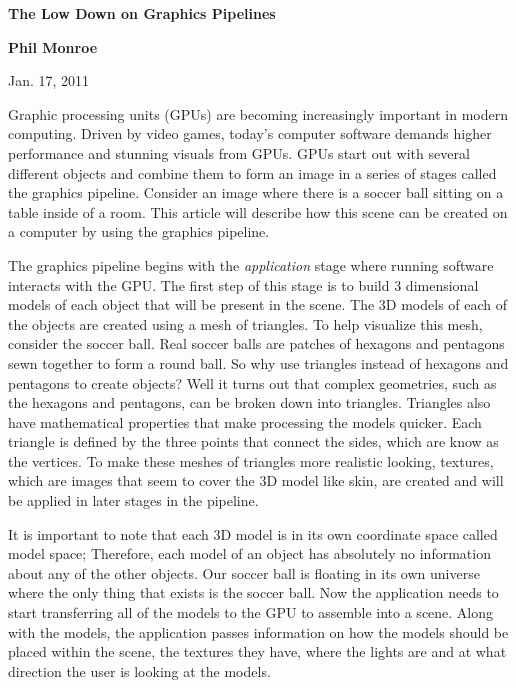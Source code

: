 \documentclass[12pt] {article}
\begin{document}

\centerline{\Large \bf The Low Down on Graphics Pipelines}

\centerline{\bf Phil Monroe}

\centerline{Jan. 17, 2011}
\bigskip


Graphic processing units (GPUs) are becoming increasingly important in modern computing. Driven by video games, today's computer software demands higher performance and stunning visuals from GPUs. GPUs start out with several different objects and combine them to form an image in a series of stages called the graphics pipeline. Consider an image where there is a soccer ball sitting on a table inside of a room. This article will describe how this scene can be created on a computer by using the graphics pipeline.

The graphics pipeline begins with the \emph{application} stage where running software interacts with the GPU. The first step of this stage is to build 3 dimensional models of each object that will be present in the scene. The 3D models of each of the objects are created using a mesh of triangles. To help visualize this mesh, consider the soccer ball. Real soccer balls are patches of hexagons and pentagons sewn together to form a round ball. So why use triangles instead of hexagons and pentagons to create objects? Well it turns out that complex geometries, such as the hexagons and pentagons, can be broken down into triangles. Triangles also have mathematical properties that make processing the models quicker. Each triangle is defined by the three points that connect the sides, which are know as the vertices. To make these meshes of triangles more realistic looking, textures, which are images that seem to cover the 3D model like skin, are created and will be applied in later stages in the pipeline.

It is important to note that each 3D model is in its own coordinate space called model space; Therefore, each model of an object has absolutely no information about any of the other objects. Our soccer ball is floating in its own universe where the only thing that exists is the soccer ball. Now the application needs to start transferring all of the models to the GPU to assemble into a scene. Along with the models, the application passes information on how the models should be placed within the scene, the textures they have, where the lights are and at what direction the user is looking at the models.
\end{document}
